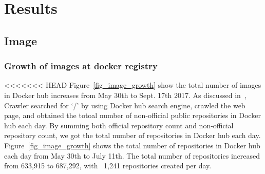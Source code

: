 
\section{Results}


\subsection{Image}

\subsubsection{Growth  of images at docker registry}

<<<<<<< HEAD
Figure~\ref{fig_image_growth} show the total number of images in Docker hub increases from May 30th to Sept. 17th 2017. As discussed in~\cite{XXX}, Crawler searched for `/' by using Docker hub search engine, crawled the web page, and obtained the totoal number of non-official public repositories in Docker hub each day. By summing both official repository count and non-official repository count, we got the total number of repositories in Docker hub each day. Figure~\ref{fig_image_growth} shows the total number of repositories in Docker hub each day from May 30th to July 11th. The total number of repositories increased from 633,915 to 687,292, with ~1,241 repositories created per day.

